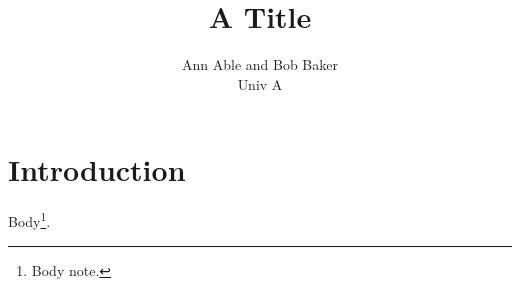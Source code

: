 \documentclass{mnras}
\title{A Title}
\author[A. Able et al.]{Ann Able and Bob Baker\footnotemark[2]\\ Univ A}
\begin{document}
\section{Introduction}
Body\footnote{Body note.}.
\end{document}
